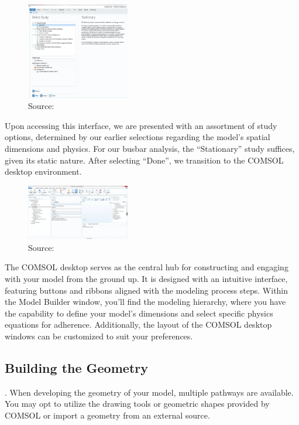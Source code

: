 \begin{figure}[ht!]
  \centering
  \includegraphics[width=0.4\textwidth]{Chapters/Figures/Chapter 3 Figures/Select Study.png}
  \caption{ Source: \cite{}}
  \label{}
\end{figure}

Upon accessing this interface, we are presented with an assortment of study options, determined by our earlier selections regarding the model's spatial dimensions and physics. For our busbar analysis, the ``Stationary'' study suffices, given its static nature. After selecting ``Done'', we transition to the COMSOL desktop environment.


\begin{figure}[ht!]
  \centering
  \includegraphics[width=0.4\textwidth]{Chapters/Figures/Chapter 3 Figures/Initial COMSOL Desktop.png}
  \caption{ Source: \cite{}}
  \label{}
\end{figure}

The COMSOL desktop serves as the central hub for constructing and engaging with your model from the ground up. It is designed with an intuitive interface, featuring buttons and ribbons aligned with the modeling process steps. Within the Model Builder window, you'll find the modeling hierarchy, where you have the capability to define your model's dimensions and select specific physics equations for adherence. Additionally, the layout of the COMSOL desktop windows can be customized to suit your preferences.


\subsection{Building the Geometry}.
When developing the geometry of your model, multiple pathways are available. You may opt to utilize the drawing tools or geometric shapes provided by COMSOL or import a geometry from an external source.

